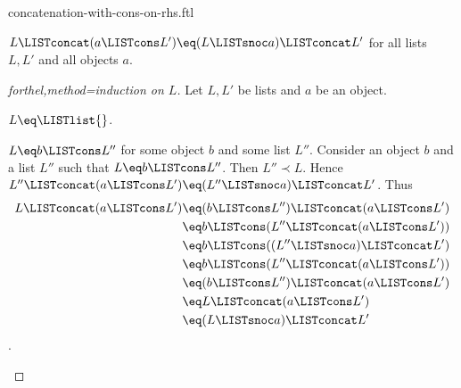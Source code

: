 \documentclass{naproche-library}
\begin{document}
\begin{smodule}[title=Concatenation with Cons on the Right-Hand Side]{concatenation-with-cons-on-rhs.ftl}

\begin{proposition}[forthel,id=RightConcatConsProp]
  $L \LISTconcat (a \LISTcons L') \eq (L \LISTsnoc a) \LISTconcat L'$ for all lists $L,L'$ and all objects $a$.
\end{proposition}
\begin{proof}[forthel,method=induction on $L$]
  Let $L,L'$ be lists and $a$ be an object.

  \begin{case}{$L \eq \LISTlist{}$.} \end{case}

  \begin{case}{$L \eq b \LISTcons L''$ for some object $b$ and some list $L''$.}
    Consider an object $b$ and a list $L''$ such that $L \eq b \LISTcons L''$.
    Then $L'' \prec L$.
    Hence $L'' \LISTconcat (a \LISTcons L') \eq (L'' \LISTsnoc a) \LISTconcat L'$.
    Thus
    \begin{align*}
      L \LISTconcat (a \LISTcons L')
        &\eq (b \LISTcons L'') \LISTconcat (a \LISTcons L')\\
        &\eq b \LISTcons (L'' \LISTconcat (a \LISTcons L'))\\
        &\eq b \LISTcons ((L'' \LISTsnoc a) \LISTconcat L')\\
        &\eq b \LISTcons (L'' \LISTconcat (a \LISTcons L'))\\
        &\eq (b \LISTcons L'') \LISTconcat (a \LISTcons L')\\
        &\eq L \LISTconcat (a \LISTcons L')\\
        &\eq (L \LISTsnoc a) \LISTconcat L'
    \end{align*}.
  \end{case}
\end{proof}
\end{smodule}
\end{document}

